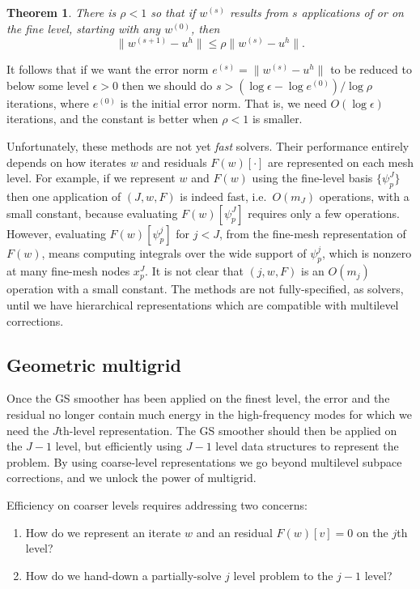 \documentclass[letterpaper,final,12pt,reqno]{amsart}
\theoremstyle{claim}
\newtheorem*{theorem}{Theorem}
\newcommand{\eps}{\epsilon}
\numberwithin{equation}{section}
\numberwithin{figure}{section}
\numberwithin{table}{section}
\begin{document}
\begin{theorem} \cite[Thm.~3.10]{GraeserKornhuber2009}  There is $\rho<1$ so that if $w^{(s)}$  results from $s$ applications of  or  on the fine level, starting with any $w^{(0)}$, then
\begin{equation}
  \|w^{(s+1)} - u^h\| \le \rho \|w^{(s)} - u^h\|.  \label{eq:mscconvergence}
\end{equation}
\end{theorem}

It follows that if we want the error norm $e^{(s)} = \|w^{(s)}-u^h\|$ to be reduced to below some level $\eps>0$ then we should do $s>(\log\eps - \log e^{(0)})/\log \rho$ iterations, where $e^{(0)}$ is the initial error norm.  That is, we need $O(\log\eps)$ iterations, and the constant is better when $\rho<1$ is smaller.

Unfortunately, these  methods are not yet \emph{fast} solvers.  Their performance entirely depends on how iterates $w$ and residuals $F(w)[\cdot]$ are represented on each mesh level.  For example, if we represent $w$ and $F(w)$ using the fine-level basis $\{\psi_p^J\}$ then one application of $(J,w,F)$ is indeed fast, i.e.~$O(m_J)$ operations, with a small constant, because evaluating $F(w)[\psi_p^J]$ requires only a few operations.  However, evaluating $F(w)[\psi_p^j]$ for $j<J$, from the fine-mesh representation of $F(w)$, means computing integrals over the wide support of $\psi_p^j$, which is nonzero at many fine-mesh nodes $x_p^J$.  It is not clear that $(j,w,F)$ is an $O(m_j)$ operation with a small constant.  The  methods are not fully-specified, as solvers, until we have hierarchical representations which are compatible with multilevel corrections.

\subsection*{Geometric multigrid}  Once the GS smoother has been applied on the finest level, the error and the residual no longer contain much energy in the high-frequency modes for which we need the $J$th-level representation.  The GS smoother should then be applied on the $J-1$ level, but efficiently using $J-1$ level data structures to represent the problem.  By using coarse-level representations we go beyond multilevel subpace corrections, and we unlock the power of multigrid.

Efficiency on coarser levels requires addressing two concerns:
\renewcommand{\labelenumi}{\emph{\roman{enumi})}}
\begin{enumerate}
\item How do we represent an iterate $w$ and an residual $F(w)[v]=0$ on the $j$th level?
\item How do we hand-down a partially-solve $j$ level problem to the $j-1$ level?
\end{enumerate}
\end{document}
